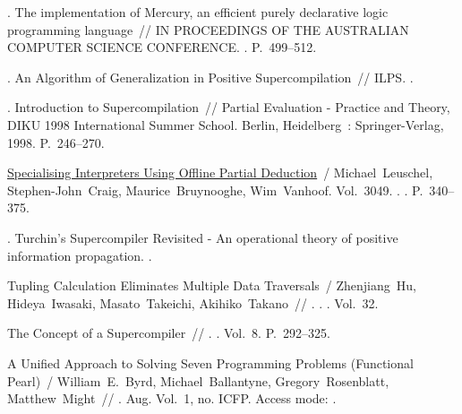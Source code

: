 \begin{thebibliography}{10}
  . The
    implementation of Mercury, an efficient purely declarative logic programming
    language~// IN PROCEEDINGS OF THE AUSTRALIAN COMPUTER SCIENCE CONFERENCE.
    \BibDash
  . \BibDash
  \newblock P.~499--512.

  . An Algorithm of
    Generalization in Positive Supercompilation~// ILPS. \BibDash
  .

  . Introduction to
    Supercompilation~// Partial Evaluation - Practice and Theory, DIKU 1998
    International Summer School. \BibDash
  \newblock Berlin, Heidelberg~: Springer-Verlag, 1998. \BibDash
  \newblock P.~246–270.

  \href{http://dx.doi.org/10.1007/978-3-540-25951-0_11}{Specialising Interpreters
    Using Offline Partial Deduction}~/ Michael~Leuschel, Stephen-John~Craig,
    Maurice~Bruynooghe, Wim~Vanhoof. \BibDash
  \newblock Vol.~3049. \BibDash
  . . \BibDash
  \newblock P.~340--375.

  . Turchin's Supercompiler Revisited - An
    operational theory of positive information propagation. \BibDash
  .

  Tupling Calculation Eliminates Multiple Data Traversals~/ Zhenjiang~Hu,
    Hideya~Iwasaki, Masato~Takeichi, Akihiko~Takano~//
    \href{http://dx.doi.org/10.1145/258948.258964}{}. \BibDash
  . . \BibDash
  \newblock Vol.~32.

   The Concept of a Supercompiler~// . \BibDash
  . \BibDash
  \newblock Vol.~8. \BibDash
  \newblock P.~292--325.

  A Unified Approach to Solving Seven Programming Problems (Functional Pearl)~/
    William~E.~Byrd, Michael~Ballantyne, Gregory~Rosenblatt, Matthew~Might~//
    \href{http://dx.doi.org/10.1145/3110252}{}
    \BibDash
  . \BibDash Aug. \BibDash
  \newblock Vol.~1, no. ICFP. \BibDash
  \newblock Access mode: .


\end{thebibliography}
